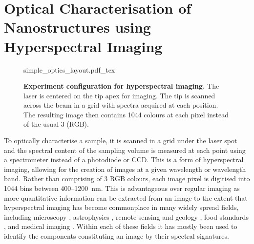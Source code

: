 \documentclass{article}
\begin{document}
\section{Optical Characterisation of Nanostructures using Hyperspectral Imaging}
\label{sec:hyperspectral_imaging}


\begin{figure}[bt]
\centering
\fontsize{10pt}{1em}\selectfont
\def\svgwidth{0.6\textwidth}
{simple_optics_layout.pdf_tex}
\caption[Experiment configuration for hyperspectral imaging]{\textbf{Experiment configuration for hyperspectral imaging.} The laser is centered on the tip apex for imaging. The tip is scanned across the beam in a grid with spectra acquired at each position. The resulting image then contains 1044 colours at each pixel instead of the usual 3 (RGB).}
\label{fig:simple_optics_layout}
\end{figure}

To optically characterise a sample, it is scanned in a grid under the laser spot and the spectral content of the sampling volume is measured at each point using a spectrometer instead of a photodiode or CCD. This is a form of hyperspectral imaging, allowing for the creation of images at a given wavelength or wavelength band. Rather than comprising of 3 RGB colours, each image pixel is digitised into 1044 bins between 400--\SI{1200}{nm}.
This is advantageous over regular imaging as more quantitative information can be extracted from an image to the extent that hyperspectral imaging has become commonplace in many widely spread fields, including microscopy \cite{schultz2001hyperspectral, leavesley2012hyperspectral}, astrophysics \cite{hege2004hyperspectral}, remote sensing and geology \cite{hackwell1996lwir, shaw2003spectral}, food standards \cite{kim2001hyperspectral, gowen2007hyperspectral}, and medical imaging \cite{vo2004hyperspectral, martin2006development, lu2014medical}. Within each of these fields it has mostly been used to identify the components constituting an image by their spectral signatures.
\end{document}
